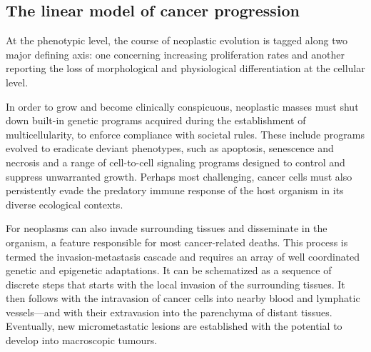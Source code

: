 \subsection{The linear model of cancer progression}
\label{sec:models-cancer-progression}

At the phenotypic level, the course of neoplastic evolution is tagged along two
major defining axis: one concerning increasing proliferation rates and another
reporting the loss of morphological and physiological differentiation at the
cellular level.\cite{tarabichi_systems_2013}


In order to grow and become clinically conspicuous, neoplastic masses must shut
down \mbox{built-in} genetic programs acquired during the establishment of
multicellularity, to enforce compliance with societal rules.  These include
programs evolved to eradicate deviant phenotypes, such as apoptosis, senescence
and necrosis and a range of \mbox{cell-to-cell} signaling programs designed to
control and suppress unwarranted growth.  Perhaps most challenging, cancer cells
must also persistently evade the predatory immune response of the host organism
in its diverse ecological contexts.

For neoplasms can also invade surrounding tissues and disseminate in the
organism, a feature responsible for most \mbox{cancer-related} deaths.  This
process is termed the \mbox{invasion-metastasis}
cascade\cite{valastyan_tumor_2011} and requires an array of well coordinated
genetic and epigenetic adaptations.  It can be schematized as a sequence of
discrete steps that starts with the local invasion of the surrounding tissues.
It then follows with the intravasion of cancer cells into nearby blood and
lymphatic vessels---and with their extravasion into the parenchyma of distant
tissues.  Eventually, new micrometastatic lesions are established with the
potential to develop into macroscopic tumours.


